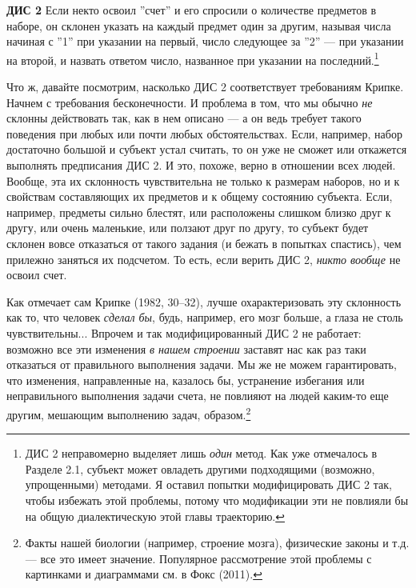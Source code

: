 \documentclass[11pt]{book}
\begin{document}
\smallskip

\textbf{ДИС 2} \quad Если некто освоил ''счет'' и его спросили о количестве предметов в наборе, он склонен указать на каждый предмет один за другим, называя числа начиная с ''1'' при указании на первый, число следующее за ''2'' --- при указании на второй, и назвать ответом число, названное при указании на последний.\footnote{ДИС 2 неправомерно выделяет лишь \textit{один} метод. Как уже отмечалось в Разделе 2.1, субъект может овладеть другими подходящими (возможно, упрощенными) методами. Я оставил попытки модифицировать ДИС 2 так, чтобы избежать этой проблемы, потому что модификации эти не повлияли бы на общую диалектическую этой главы траекторию.}

\smallskip

Что ж, давайте посмотрим, насколько ДИС 2 соответствует требованиям Крипке. Начнем с требования бесконечности. И проблема в том, что мы обычно \textit{не} склонны действовать так, как в нем описано --- а он ведь требует такого поведения при любых или почти любых обстоятельствах. Если, например, набор достаточно большой и субъект устал считать, то он уже не сможет или откажется выполнять предписания ДИС 2. И это, похоже, верно в отношении всех людей. Вообще, эта их склонность чувствительна не только к размерам наборов, но и к свойствам составляющих их предметов и к общему состоянию субъекта. Если, например, предметы сильно блестят, или расположены слишком близко друг к другу, или очень маленькие, или ползают друг по другу, то субъект будет склонен вовсе отказаться от такого задания (и бежать в попытках спастись), чем прилежно заняться их подсчетом. То есть, если верить ДИС 2, \textit{никто вообще} не освоил счет.

Как отмечает сам Крипке (1982, 30–32), лучше охарактеризовать эту склонность как то, что человек \textit{сделал бы}, будь, например, его мозг больше, а глаза не столь чувствительны... Впрочем и так модифицированный ДИС 2 не работает: возможно все эти изменения \textit{в нашем строении} заставят нас как раз таки отказаться от правильного выполнения задачи. Мы же не можем гарантировать, что изменения, направленные на, казалось бы, устранение избегания или неправильного выполнения задачи счета, не повлияют на людей каким-то еще другим, мешающим выполнению задач, образом.\footnote{Факты нашей биологии (например, строение мозга), физические законы и т.д. --- все это имеет значение. Популярное рассмотрение этой проблемы с картинками и диаграммами см. в Фокс (2011).}
\end{document}
